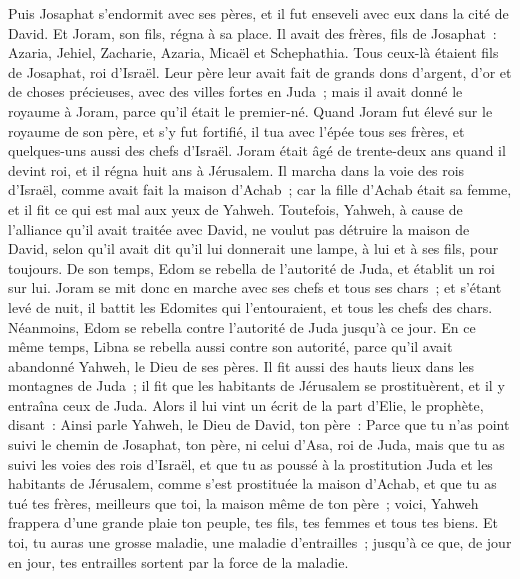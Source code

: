 \begin{multicols}{2}
\VerseOne{}Puis Josaphat s'endormit avec ses pères, et il fut enseveli avec eux dans la cité de David. Et Joram, son fils, régna à sa place.
Il avait des frères, fils de Josaphat~: Azaria, Jehiel, Zacharie, Azaria, Micaël et Schephathia. Tous ceux-là étaient fils de Josaphat, roi d'Israël.
Leur père leur avait fait de grands dons d'argent, d'or et de choses précieuses, avec des villes fortes en Juda~; mais il avait donné le royaume à Joram, parce qu'il était le premier-né.
Quand Joram fut élevé sur le royaume de son père, et s'y fut fortifié, il tua avec l'épée tous ses frères, et quelques-uns aussi des chefs d'Israël.
Joram était âgé de trente-deux ans quand il devint roi, et il régna huit ans à Jérusalem.
Il marcha dans la voie des rois d'Israël, comme avait fait la maison d'Achab~; car la fille d'Achab était sa femme, et il fit ce qui est mal aux yeux de Yahweh.
Toutefois, Yahweh, à cause de l'alliance qu'il avait traitée avec David, ne voulut pas détruire la maison de David, selon qu'il avait dit qu'il lui donnerait une lampe, à lui et à ses fils, pour toujours.
De son temps, Edom se rebella de l'autorité de Juda, et établit un roi sur lui.
Joram se mit donc en marche avec ses chefs et tous ses chars~; et s'étant levé de nuit, il battit les Edomites qui l'entouraient, et tous les chefs des chars.
Néanmoins, Edom se rebella contre l'autorité de Juda jusqu'à ce jour. En ce même temps, Libna se rebella aussi contre son autorité, parce qu'il avait abandonné Yahweh, le Dieu de ses pères.
Il fit aussi des hauts lieux dans les montagnes de Juda~; il fit que les habitants de Jérusalem se prostituèrent, et il y entraîna ceux de Juda.
Alors il lui vint un écrit de la part d'Elie, le prophète, disant~: Ainsi parle Yahweh, le Dieu de David, ton père~: Parce que tu n'as point suivi le chemin de Josaphat, ton père, ni celui d'Asa, roi de Juda,
mais que tu as suivi les voies des rois d'Israël, et que tu as poussé à la prostitution Juda et les habitants de Jérusalem, comme s'est prostituée la maison d'Achab, et que tu as tué tes frères, meilleurs que toi, la maison même de ton père~;
voici, Yahweh frappera d'une grande plaie ton peuple, tes fils, tes femmes et tous tes biens.
Et toi, tu auras une grosse maladie, une maladie d'entrailles~; jusqu'à ce que, de jour en jour, tes entrailles sortent par la force de la maladie.

\end{multicols}
